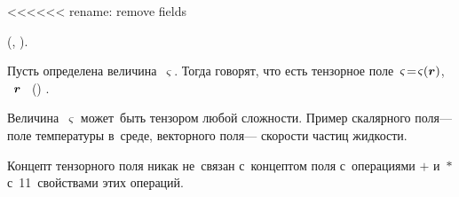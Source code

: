 

\label{para:spatialdifferentiationoftensorfields} <<<<<< rename: remove fields

\begin{changemargin}{\parindent}{\parindent}
\vspace{-0.1em}
\small
\flushright
\textit{}\ru{\:---} \ru{,}  (, ).

\par\vspace{.3em}
\end{changemargin}

\begin{otherlanguage}{russian}

\noindent
Пусть    определена величина~$\varsigma$.
Тогда говорят, что есть тензорное поле~${\varsigma \!=\! \varsigma(\bm{r})}$, ~$\bm{r}$\ru{\:---} ~()  .

Величина~$\varsigma$ может~быть тензором любой сложности.
Пример скалярного поля\:--- поле температуры в~среде, векторного поля\:--- скорости частиц жидкости.

Концепт тензорного поля никак не~связан с~концептом поля с~операциями $+$ и~$*$ с~11~свойствами этих операций.

\end{otherlanguage}



